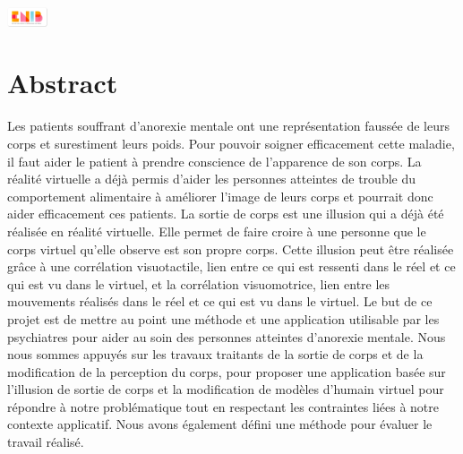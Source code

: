 \documentclass[11pt]{article}
\begin{document}
\begin{titlepage}
\begin{center}

\begin{flushleft}
\includegraphics[width=0.09\textwidth]{./logo_ENIB}
\end{flushleft}
\end{center}
\end{titlepage}




\thispagestyle{empty}
\section*{Abstract}
Les patients souffrant d'anorexie mentale ont une représentation faussée de leurs corps et surestiment leurs poids. Pour pouvoir soigner efficacement cette maladie, il faut aider le patient à prendre conscience de l'apparence de son corps. La réalité virtuelle a déjà permis d'aider les personnes atteintes de trouble du comportement alimentaire à améliorer l'image de leurs corps et pourrait donc aider efficacement ces patients. La sortie de corps est une illusion qui a déjà été réalisée en réalité virtuelle. Elle permet de faire croire à une personne que le corps virtuel qu'elle observe est son propre corps. Cette illusion peut être réalisée grâce à une corrélation visuotactile, lien entre ce qui est ressenti dans le réel et ce qui est vu dans le virtuel, et la corrélation visuomotrice, lien entre les mouvements réalisés dans le réel et ce qui est vu dans le virtuel. Le but de ce projet est de mettre au point une méthode et une application utilisable par les psychiatres pour aider au soin des personnes atteintes d'anorexie mentale. Nous nous sommes appuyés sur les travaux traitants de la sortie de corps et de la modification de la perception du corps, pour proposer une application basée sur l'illusion de sortie de corps et la modification de modèles d'humain virtuel pour répondre à notre problématique tout en respectant les contraintes liées à notre contexte applicatif. Nous avons également défini une méthode pour évaluer le travail réalisé.
\end{document}
